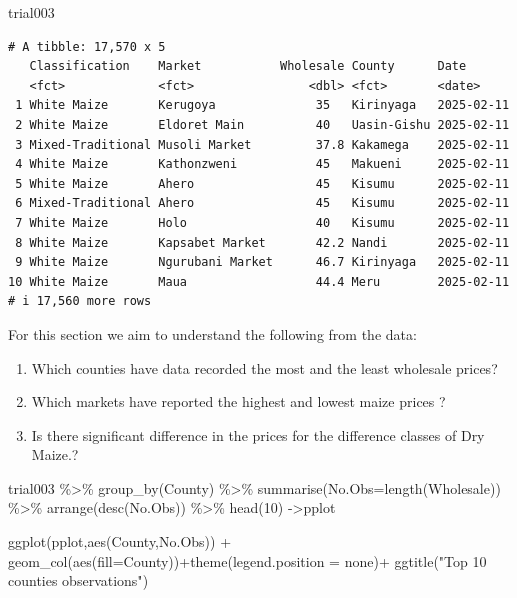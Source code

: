 \documentclass[
  letterpaper,
  DIV=11,
  numbers=noendperiod]{scrartcl}
\newenvironment{Shaded}{\begin{snugshade}}{\end{snugshade}}
\newcommand{\AttributeTok}[1]{\textcolor[rgb]{0.40,0.45,0.13}{#1}}
\newcommand{\DecValTok}[1]{\textcolor[rgb]{0.68,0.00,0.00}{#1}}
\newcommand{\FunctionTok}[1]{\textcolor[rgb]{0.28,0.35,0.67}{#1}}
\newcommand{\NormalTok}[1]{\textcolor[rgb]{0.00,0.23,0.31}{#1}}
\newcommand{\OtherTok}[1]{\textcolor[rgb]{0.00,0.23,0.31}{#1}}
\newcommand{\SpecialCharTok}[1]{\textcolor[rgb]{0.37,0.37,0.37}{#1}}
\newcommand{\StringTok}[1]{\textcolor[rgb]{0.13,0.47,0.30}{#1}}
\begin{document}
\begin{Shaded}
\begin{Highlighting}[]
\NormalTok{trial003}
\end{Highlighting}
\end{Shaded}

\begin{verbatim}
# A tibble: 17,570 x 5
   Classification    Market           Wholesale County      Date      
   <fct>             <fct>                <dbl> <fct>       <date>    
 1 White Maize       Kerugoya              35   Kirinyaga   2025-02-11
 2 White Maize       Eldoret Main          40   Uasin-Gishu 2025-02-11
 3 Mixed-Traditional Musoli Market         37.8 Kakamega    2025-02-11
 4 White Maize       Kathonzweni           45   Makueni     2025-02-11
 5 White Maize       Ahero                 45   Kisumu      2025-02-11
 6 Mixed-Traditional Ahero                 45   Kisumu      2025-02-11
 7 White Maize       Holo                  40   Kisumu      2025-02-11
 8 White Maize       Kapsabet Market       42.2 Nandi       2025-02-11
 9 White Maize       Ngurubani Market      46.7 Kirinyaga   2025-02-11
10 White Maize       Maua                  44.4 Meru        2025-02-11
# i 17,560 more rows
\end{verbatim}

For this section we aim to understand the following from the data:

\begin{enumerate}
\def\labelenumi{\arabic{enumi}.}
\item
  Which counties have data recorded the most and the least wholesale
  prices?
\item
  Which markets have reported the highest and lowest maize prices ?
\item
  Is there significant difference in the prices for the difference
  classes of Dry Maize.?
\end{enumerate}

\begin{Shaded}
\begin{Highlighting}[]
\NormalTok{trial003 }\SpecialCharTok{\%\textgreater{}\%} \FunctionTok{group\_by}\NormalTok{(County) }\SpecialCharTok{\%\textgreater{}\%} \FunctionTok{summarise}\NormalTok{(}\AttributeTok{No.Obs=}\FunctionTok{length}\NormalTok{(Wholesale)) }\SpecialCharTok{\%\textgreater{}\%} \FunctionTok{arrange}\NormalTok{(}\FunctionTok{desc}\NormalTok{(No.Obs)) }\SpecialCharTok{\%\textgreater{}\%} \FunctionTok{head}\NormalTok{(}\DecValTok{10}\NormalTok{) }\OtherTok{{-}\textgreater{}}\NormalTok{pplot}

\FunctionTok{ggplot}\NormalTok{(pplot,}\FunctionTok{aes}\NormalTok{(County,No.Obs)) }\SpecialCharTok{+} \FunctionTok{geom\_col}\NormalTok{(}\FunctionTok{aes}\NormalTok{(}\AttributeTok{fill=}\NormalTok{County))}\SpecialCharTok{+}\FunctionTok{theme}\NormalTok{(}\AttributeTok{legend.position =} \StringTok{\textquotesingle{}none\textquotesingle{}}\NormalTok{)}\SpecialCharTok{+} \FunctionTok{ggtitle}\NormalTok{(}\StringTok{"Top 10 counties observations"}\NormalTok{)}
\end{Highlighting}
\end{Shaded}
\end{document}

